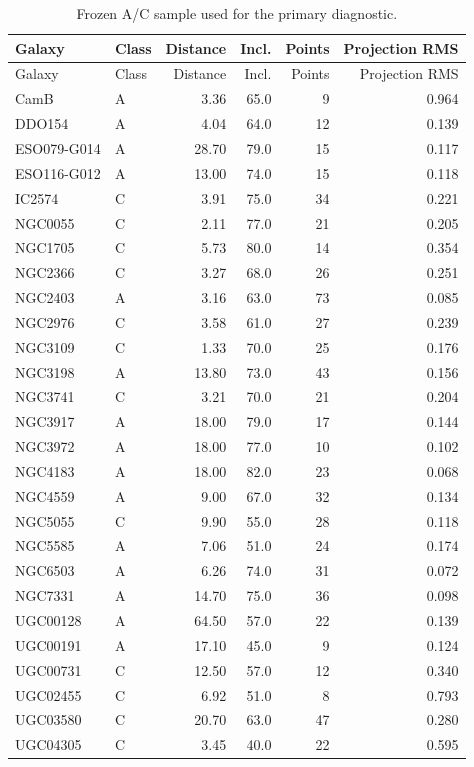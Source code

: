 \documentclass[11pt]{article}
\begin{document}
\begin{longtable}{llrrrr}
\caption{Frozen A/C sample used for the primary diagnostic.}\\
\toprule
Galaxy & Class & Distance & Incl. & Points & Projection RMS\\
\midrule
\endfirsthead
\toprule
Galaxy & Class & Distance & Incl. & Points & Projection RMS\\
\midrule
\endhead
CamB & A & 3.36 & 65.0 & 9 & 0.964\\
DDO154 & A & 4.04 & 64.0 & 12 & 0.139\\
ESO079-G014 & A & 28.70 & 79.0 & 15 & 0.117\\
ESO116-G012 & A & 13.00 & 74.0 & 15 & 0.118\\
IC2574 & C & 3.91 & 75.0 & 34 & 0.221\\
NGC0055 & C & 2.11 & 77.0 & 21 & 0.205\\
NGC1705 & C & 5.73 & 80.0 & 14 & 0.354\\
NGC2366 & C & 3.27 & 68.0 & 26 & 0.251\\
NGC2403 & A & 3.16 & 63.0 & 73 & 0.085\\
NGC2976 & C & 3.58 & 61.0 & 27 & 0.239\\
NGC3109 & C & 1.33 & 70.0 & 25 & 0.176\\
NGC3198 & A & 13.80 & 73.0 & 43 & 0.156\\
NGC3741 & C & 3.21 & 70.0 & 21 & 0.204\\
NGC3917 & A & 18.00 & 79.0 & 17 & 0.144\\
NGC3972 & A & 18.00 & 77.0 & 10 & 0.102\\
NGC4183 & A & 18.00 & 82.0 & 23 & 0.068\\
NGC4559 & A & 9.00 & 67.0 & 32 & 0.134\\
NGC5055 & C & 9.90 & 55.0 & 28 & 0.118\\
NGC5585 & A & 7.06 & 51.0 & 24 & 0.174\\
NGC6503 & A & 6.26 & 74.0 & 31 & 0.072\\
NGC7331 & A & 14.70 & 75.0 & 36 & 0.098\\
UGC00128 & A & 64.50 & 57.0 & 22 & 0.139\\
UGC00191 & A & 17.10 & 45.0 & 9 & 0.124\\
UGC00731 & C & 12.50 & 57.0 & 12 & 0.340\\
UGC02455 & C & 6.92 & 51.0 & 8 & 0.793\\
UGC03580 & C & 20.70 & 63.0 & 47 & 0.280\\
UGC04305 & C & 3.45 & 40.0 & 22 & 0.595\\

\end{longtable}
\end{document}
